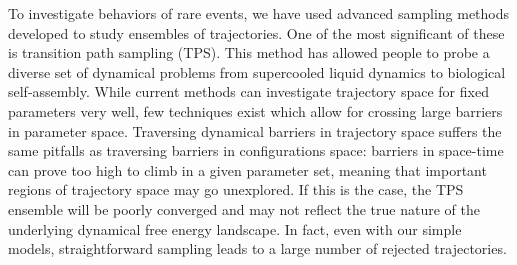 \documentclass[11pt]{article}
\begin{document}

To investigate behaviors of rare events, we have used advanced sampling methods developed to study ensembles of trajectories. One of the most significant of these is transition path sampling (TPS). %
This method has allowed people to probe a diverse set of dynamical problems from supercooled liquid dynamics %
to biological self-assembly. %
While current methods can investigate trajectory space for fixed parameters very well, few techniques exist which allow for crossing large barriers in parameter space. Traversing dynamical barriers in trajectory space suffers the same pitfalls as traversing barriers in configurations space: barriers in space-time can prove too high to climb in a given parameter set, meaning that important regions of trajectory space may go unexplored.  If this is the case, the TPS ensemble will be poorly converged and may not reflect the true nature of the underlying dynamical free energy landscape. In fact, even with our simple models, straightforward sampling leads to a large number of rejected trajectories.

\end{document}

